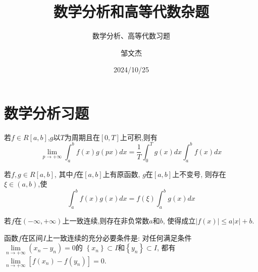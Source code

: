 \documentclass[lang=cn,newtx,10pt,scheme=chinese]{../Template/elegantbook}
\title{数学分析和高等代数杂题}
\subtitle{数学分析、高等代数习题}
\author{邹文杰}
\institute{无}
\date{2024/10/25}
\begin{document}
\maketitle
\frontmatter

\tableofcontents

\mainmatter%


\chapter{数学分析习题}

\begin{lemma}[Riemann 引理] \label{thm:Riemann}
若$f\in R\left[ a,b \right] $,$g$以$T$为周期且在$\left[ 0,T \right] $上可积,则有
\begin{equation}
\underset{p\rightarrow +\infty}{\lim}\int_a^b{f\left( x \right) g\left( px \right) dx=\frac{1}{T}}\int_0^T{g\left( x \right) dx}\int_a^b{f\left( x \right) dx}
\end{equation}
\end{lemma}

\begin{theorem}[积分第一中值定理的推广] \label{thm:JFDYZZ}
若$f,g\in R\left[ a,b \right] $,
其中$f$在$\left[ a,b \right] $上有原函数,
$g$在$\left[ a,b \right] $上不变号,
则存在$\xi \in \left( a,b \right) $,使
\begin{equation}
\int_a^b{f\left( x \right) g\left( x \right) dx}=f\left( \xi \right) \int_a^b{g\left( x \right) dx}
\end{equation}
\end{theorem}

\begin{proposition} \label{pro:YZLXHS}
若$f$在$\left( -\infty ,+\infty \right) $上一致连续,则存在非负常数$a$和$b$,
使得成立$\left| f\left( x \right) \right|\leqslant a\left| x \right|+b$.
\end{proposition}

\begin{proposition} \label{pro:HSYZLXCYTJ}
函数$f$在区间$I$上一致连续的充分必要条件是:
对任何满足条件$\underset{n\rightarrow +\infty}{\lim}\left( x_n-y_n \right) =0$的
$\left\{ x_n \right\} \subset I$和$\left\{ y_n \right\} \subset I$,
都有$\underset{n\rightarrow +\infty}{\lim}\left[ f\left( x_n \right) -f\left( y_n \right) \right] =0$.
\end{proposition}


\newpage
\end{document}
